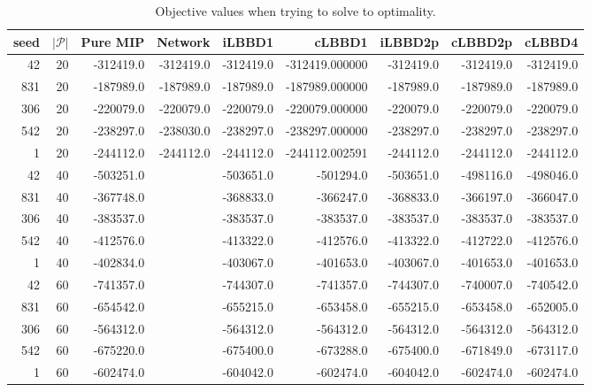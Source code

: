\begin{table*}
    \centering
    \caption{Objective values when trying to solve to optimality.}
    \begin{tabular}{rrrrrrrrr} \toprule
        seed & $|\mathcal{P}|$ & Pure MIP & Network & iLBBD1 & cLBBD1 & iLBBD2p & cLBBD2p & cLBBD4 \\\midrule
  42      &      20         & -312419.0 &    -312419.0     & -312419.0 &-312419.000000 & -312419.0 & -312419.0 & -312419.0 \\
 831      &      20         & -187989.0  &   -187989.0     &-187989.0 & -187989.000000 & -187989.0 & -187989.0 &-187989.0 \\
  306      &      20       & -220079.0 &   -220079.0        &-220079.0 & -220079.000000 & -220079.0 & -220079.0 & -220079.0 \\
 542       &     20        & -238297.0 &  -238030.0        &-238297.0 & -238297.000000 & -238297.0 & -238297.0 & -238297.0 \\
    1      &      20       & -244112.0 &  -244112.0        &-244112.0 & -244112.002591 & -244112.0  & -244112.0 & -244112.0 \\\midrule
    42       &    40& -503251.0& &-503651.0& -501294.0& -503651.0& -498116.0& -498046.0 \\
    831     &       40& -367748.0&& -368833.0& -366247.0& -368833.0& -366197.0& -366047.0 \\
    306   &         40& -383537.0&& -383537.0& -383537.0& -383537.0& -383537.0& -383537.0 \\
    542   &         40& -412576.0&& -413322.0& -412576.0& -413322.0& -412722.0& -412576.0 \\
    1     &       40& -402834.0&& -403067.0& -401653.0& -403067.0& -401653.0& -401653.0 \\\midrule
    42     &       60 &-741357.0&& -744307.0& -741357.0 &-744307.0& -740007.0& -740542.0 \\
    831   &         60& -654542.0&& -655215.0& -653458.0& -655215.0& -653458.0 &-652005.0\\
    306    &        60& -564312.0&& -564312.0& -564312.0 &-564312.0& -564312.0& -564312.0\\
    542     &       60& -675220.0&& -675400.0& -673288.0& -675400.0& -671849.0& -673117.0\\
    1       &     60 &-602474.0&& -604042.0& -602474.0& -604042.0 &-602474.0& -602474.0\\
    \bottomrule
    \end{tabular}
\end{table*}
